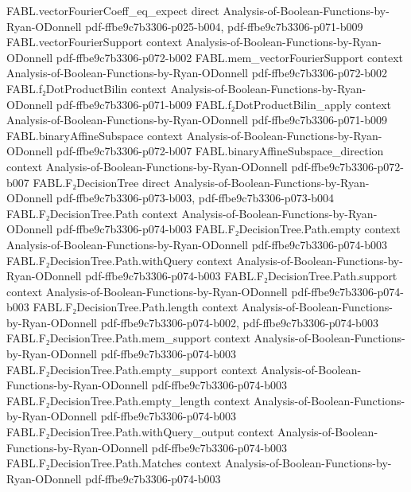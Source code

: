 \begin{theorem}
\proofstep
  {FABL.vectorFourierCoeff_eq_expect}
  {direct}
  {Analysis-of-Boolean-Functions-by-Ryan-ODonnell}
  {pdf-ffbe9c7b3306-p025-b004,
    pdf-ffbe9c7b3306-p071-b009}
\proofstep
  {FABL.vectorFourierSupport}
  {context}
  {Analysis-of-Boolean-Functions-by-Ryan-ODonnell}
  {pdf-ffbe9c7b3306-p072-b002}
\proofstep
  {FABL.mem_vectorFourierSupport}
  {context}
  {Analysis-of-Boolean-Functions-by-Ryan-ODonnell}
  {pdf-ffbe9c7b3306-p072-b002}
\proofstep
  {FABL.f₂DotProductBilin}
  {context}
  {Analysis-of-Boolean-Functions-by-Ryan-ODonnell}
  {pdf-ffbe9c7b3306-p071-b009}
\proofstep
  {FABL.f₂DotProductBilin_apply}
  {context}
  {Analysis-of-Boolean-Functions-by-Ryan-ODonnell}
  {pdf-ffbe9c7b3306-p071-b009}
\proofstep
  {FABL.binaryAffineSubspace}
  {context}
  {Analysis-of-Boolean-Functions-by-Ryan-ODonnell}
  {pdf-ffbe9c7b3306-p072-b007}
\proofstep
  {FABL.binaryAffineSubspace_direction}
  {context}
  {Analysis-of-Boolean-Functions-by-Ryan-ODonnell}
  {pdf-ffbe9c7b3306-p072-b007}
\proofstep
  {FABL.F₂DecisionTree}
  {direct}
  {Analysis-of-Boolean-Functions-by-Ryan-ODonnell}
  {pdf-ffbe9c7b3306-p073-b003,
    pdf-ffbe9c7b3306-p073-b004}
\proofstep
  {FABL.F₂DecisionTree.Path}
  {context}
  {Analysis-of-Boolean-Functions-by-Ryan-ODonnell}
  {pdf-ffbe9c7b3306-p074-b003}
\proofstep
  {FABL.F₂DecisionTree.Path.empty}
  {context}
  {Analysis-of-Boolean-Functions-by-Ryan-ODonnell}
  {pdf-ffbe9c7b3306-p074-b003}
\proofstep
  {FABL.F₂DecisionTree.Path.withQuery}
  {context}
  {Analysis-of-Boolean-Functions-by-Ryan-ODonnell}
  {pdf-ffbe9c7b3306-p074-b003}
\proofstep
  {FABL.F₂DecisionTree.Path.support}
  {context}
  {Analysis-of-Boolean-Functions-by-Ryan-ODonnell}
  {pdf-ffbe9c7b3306-p074-b003}
\proofstep
  {FABL.F₂DecisionTree.Path.length}
  {context}
  {Analysis-of-Boolean-Functions-by-Ryan-ODonnell}
  {pdf-ffbe9c7b3306-p074-b002,
    pdf-ffbe9c7b3306-p074-b003}
\proofstep
  {FABL.F₂DecisionTree.Path.mem_support}
  {context}
  {Analysis-of-Boolean-Functions-by-Ryan-ODonnell}
  {pdf-ffbe9c7b3306-p074-b003}
\proofstep
  {FABL.F₂DecisionTree.Path.empty_support}
  {context}
  {Analysis-of-Boolean-Functions-by-Ryan-ODonnell}
  {pdf-ffbe9c7b3306-p074-b003}
\proofstep
  {FABL.F₂DecisionTree.Path.empty_length}
  {context}
  {Analysis-of-Boolean-Functions-by-Ryan-ODonnell}
  {pdf-ffbe9c7b3306-p074-b003}
\proofstep
  {FABL.F₂DecisionTree.Path.withQuery_output}
  {context}
  {Analysis-of-Boolean-Functions-by-Ryan-ODonnell}
  {pdf-ffbe9c7b3306-p074-b003}
\proofstep
  {FABL.F₂DecisionTree.Path.Matches}
  {context}
  {Analysis-of-Boolean-Functions-by-Ryan-ODonnell}
  {pdf-ffbe9c7b3306-p074-b003}

\end{theorem}
